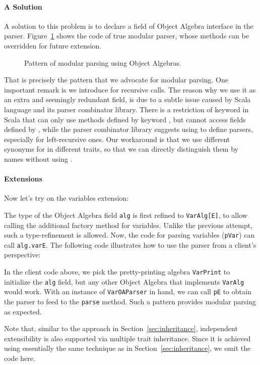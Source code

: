 \paragraph{A Solution}
A solution to this problem is to declare a field of Object Algebra interface
in the parser. Figure~\ref{fig:oa-parser} shows the code of true modular parser,
whose methods can be overridden for future extension.

\begin{figure}
  \caption{Pattern of modular parsing using Object Algebras.}
  \label{fig:oa-parser}
  \vspace{-0.2cm}
\end{figure}

That is precisely the pattern that we advocate for modular parsing.
One important remark is we introduce  for recursive calls.
The reason why we use it as an extra and seemingly redundant field, is due to a subtle issue caused by Scala language and its parser combinator library. There is a restriction of  keyword in Scala that  can only use methods defined by keyword , but cannot access fields defined by , while the parser combinator library suggests using  to define parsers, especially for left-recursive ones. Our workaround is that we use different synonyms for  in different traits, so that we can directly distinguish them by names without using .

\paragraph{Extensions}
Now let's try on the variables extension:


\noindent The type of the Object Algebra field \lstinline{alg} is first refined
to \lstinline{VarAlg[E]}, to allow calling the additional factory method
for variables. Unlike the previous attempt, such a type-refinement is allowed.
Now, the code for parsing variables (\lstinline{pVar}) can
call \lstinline{alg.varE}. The following code illustrates how to use
the parser from a client's perspective:


In the client code above,
we pick the pretty-printing algebra \lstinline{VarPrint} to initialize the \lstinline{alg} field, but any other Object
Algebra that implements \lstinline{VarAlg} would work.
With an instance of \lstinline{VarOAParser} in hand, we can call
\lstinline{pE} to obtain the parser to feed to the \lstinline{parse} method.
Such a pattern provides modular parsing as expected.

Note that, similar to the approach in Section~\ref{sec:inheritance}, independent extensibility is also supported via multiple trait inheritance.
Since it is achieved using essentially the same technique as in Section~\ref{sec:inheritance}, we omit the code here.
